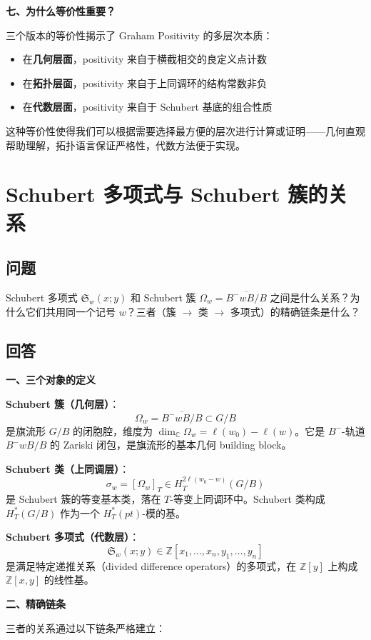 \textbf{七、为什么等价性重要？}

三个版本的等价性揭示了 Graham Positivity 的多层次本质：
\begin{itemize}
\item 在\textbf{几何层面}，positivity 来自于横截相交的良定义点计数
\item 在\textbf{拓扑层面}，positivity 来自于上同调环的结构常数非负
\item 在\textbf{代数层面}，positivity 来自于 Schubert 基底的组合性质
\end{itemize}

这种等价性使得我们可以根据需要选择最方便的层次进行计算或证明——几何直观帮助理解，拓扑语言保证严格性，代数方法便于实现。

\section{Schubert 多项式与 Schubert 簇的关系}\label{sec:qa-SchubertPolynomialVsVariety}
\subsection{问题}
Schubert 多项式 $\mathfrak{S}_w(x;y)$ 和 Schubert 簇 $\Omega_w = \overline{B^-wB/B}$ 之间是什么关系？为什么它们共用同一个记号 $w$？三者（簇 $\to$ 类 $\to$ 多项式）的精确链条是什么？

\subsection{回答}

\textbf{一、三个对象的定义}

\textbf{Schubert 簇（几何层）}：
$$\Omega_w = \overline{B^-wB/B} \subset G/B$$
是旗流形 $G/B$ 的闭胞腔，维度为 $\dim_{\mathbb{C}} \Omega_w = \ell(w_0) - \ell(w)$。它是 $B^-$-轨道 $B^-wB/B$ 的 Zariski 闭包，是旗流形的基本几何 building block。

\textbf{Schubert 类（上同调层）}：
$$\sigma_w = [\Omega_w]_T \in H_T^{2\ell(w_0-w)}(G/B)$$
是 Schubert 簇的等变基本类，落在 $T$-等变上同调环中。Schubert 类构成 $H_T^*(G/B)$ 作为一个 $H_T^*(pt)$-模的基。

\textbf{Schubert 多项式（代数层）}：
$$\mathfrak{S}_w(x;y) \in \mathbb{Z}[x_1,\ldots,x_n,y_1,\ldots,y_n]$$
是满足特定递推关系（divided difference operators）的多项式，在 $\mathbb{Z}[y]$ 上构成 $\mathbb{Z}[x,y]$ 的线性基。

\textbf{二、精确链条}

三者的关系通过以下链条严格建立：

